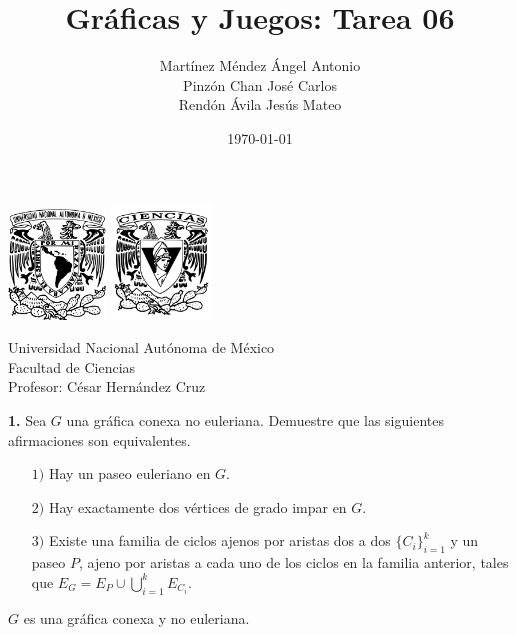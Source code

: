 \documentclass[12pt]{article}
\title{\textbf{Gráficas y Juegos: Tarea 06}}
\author{Martínez Méndez Ángel Antonio\\Pinzón Chan José Carlos\\Rendón Ávila Jesús Mateo}
\date{\today}
\begin{document}
\maketitle
\begin{center}
\vspace{3cm}
\includegraphics[width=0.195\textwidth]{Escudo.png}
\hspace{0.5cm}
\includegraphics[width=0.2\textwidth]{logo_ciencias.png}
\end{center}
\begin{center}
    \vspace{1cm}
    Universidad Nacional Autónoma de México\\
    Facultad de Ciencias\\
    Profesor: César Hernández Cruz\\
\end{center}

\newpage

%
%
\textbf{1.} Sea $G$ una gráfica conexa no euleriana. Demuestre que las siguientes afirmaciones son equivalentes.
\begin{enumerate}

\item[$1)$] Hay un paseo euleriano en $G$.

\item[$2)$] Hay exactamente dos vértices de grado impar en $G$.

\item [$3)$]Existe una familia de ciclos ajenos por aristas dos a dos $\{C_i \}_{i=1}^k$ y un paseo $P$, ajeno por aristas a cada uno de los ciclos en la familia anterior, tales que $E_G = E_P \cup \bigcup_{i=1}^k E_{C_i}$.

\end{enumerate}
\begin{tcolorbox}[title=\textbf{Hipótesis (General)}, colback=red!15!white, colframe=black!]
	
$G$ es una gráfica conexa y no euleriana.
 
\end{tcolorbox}
	
\end{document}
